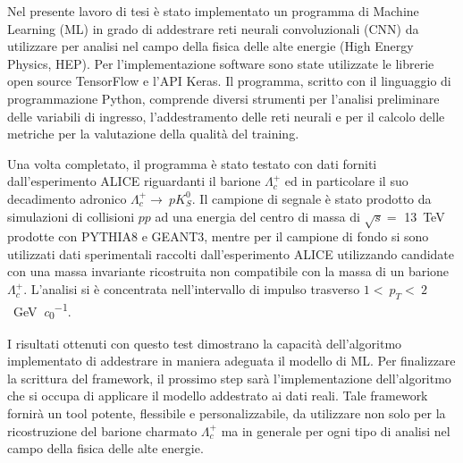 Nel presente lavoro di tesi è stato implementato un programma di Machine Learning (ML) in grado di addestrare reti neurali convoluzionali (CNN) da utilizzare per analisi nel campo della fisica delle alte energie (High Energy Physics, HEP). Per l’implementazione software sono state utilizzate le librerie open source TensorFlow e l’API Keras. Il programma, scritto con il linguaggio di programmazione Python, comprende diversi strumenti per l’analisi preliminare delle variabili di ingresso, l’addestramento delle reti neurali e per il calcolo delle metriche per la valutazione della qualità del training. 

Una volta completato, il programma è stato testato con dati forniti dall’esperimento ALICE riguardanti il barione $\Lambda_{c}^{+}$ ed in particolare il suo decadimento adronico $\Lambda_{c}^{+} \to~p K^{0}_{S}$. Il campione di segnale è stato prodotto da simulazioni di collisioni $pp$ ad una energia del centro di massa di $\sqrt{s} = $ \qty{13}{\tera \eV} prodotte con PYTHIA8 e GEANT3, mentre per il campione di fondo si sono utilizzati dati sperimentali raccolti dall’esperimento ALICE utilizzando candidate con una massa invariante ricostruita non compatibile con la massa di un barione $\Lambda_{c}^{+}$. L’analisi si è concentrata nell’intervallo di impulso trasverso $1 <~\!p_{T} <~\!2$~\unit{\giga \eV \per \clight}.

I risultati ottenuti con questo test dimostrano la capacità dell’algoritmo implementato di addestrare in maniera adeguata il modello di ML. Per finalizzare la scrittura del framework, il prossimo step sarà l’implementazione dell’algoritmo che si occupa di applicare il modello addestrato ai dati reali. Tale framework fornirà un tool potente, flessibile e personalizzabile, da utilizzare non solo per la ricostruzione del barione charmato $\Lambda_{c}^{+}$ ma in generale per ogni tipo di analisi nel campo della fisica delle alte energie.

